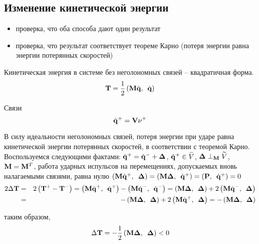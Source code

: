 
\subsection{Изменение кинетической энергии}

\begin{itemize}
    \item проверка, что оба способа дают один результат
    \item проверка, что результат соответствует теореме Карно (потеря энергии равна энергии потерянных скоростей)
\end{itemize}

Кинетическая энергия в системе без неголономных связей -- квадратичная форма.
\begin{equation*}
\eqTquad
\end{equation*}

Связи
\begin{equation*}
\eqDqVnu
\end{equation*}

В силу идеальности неголономных связей, потеря энергии при ударе равна кинетической энергии потерянных скоростей, в соответствии с теоремой Карно.
Воспользуемся следующими фактами: $\edQposleDelta$, $\eqDqposleInSubspace$, $\eqDeltaOrth$, $\edMkeSim$, работа ударных испульсов на перемещениях, допускаемых вновь налагаемыми связями, равна нулю $\logicWorkZero$
\begin{eqnarray*}
\logicDeltaT
\end{eqnarray*}

таким образом,
\begin{equation*}
\eqDeltaT
\end{equation*}

